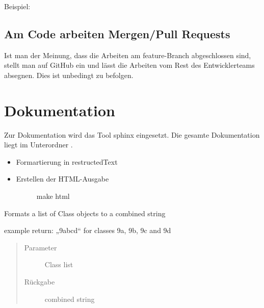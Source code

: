\documentclass[letterpaper,10pt,ngerman]{sphinxmanual}
\begin{document}
Beispiel: 


\section{Am Code arbeiten \textendash{} Mergen/Pull Requests}
\label{\detokenize{dev/git:am-code-arbeiten-mergen-pull-requests}}
Ist man der Meinung, dass die Arbeiten am feature-Branch abgeschlossen sind, stellt man auf GitHub ein  und lässt die Arbeiten vom Rest des Entwicklerteams absegnen.
Dies ist unbedingt zu befolgen.


\chapter{Dokumentation}
\label{\detokenize{dev/doc:dokumentation}}\label{\detokenize{dev/doc::doc}}
Zur Dokumentation wird das Tool sphinx eingesetzt. Die gesamte Dokumentation liegt im Unterordner .
\begin{itemize}
\item {} 
Formartierung in restructedText

\item {} \begin{description}
\item[{Erstellen der HTML-Ausgabe}] \leavevmode
make html

\end{description}

\end{itemize}
\label{\detokenize{index:module-untisconnect.api}}

\begin{fulllineitems}
\label{\detokenize{index:untisconnect.api.format_classes}}
Formats a list of Class objects to a combined string

example return: „9abcd“ for classes 9a, 9b, 9c and 9d
\begin{quote}\begin{description}
\item[{Parameter}] \leavevmode
{} \textendash{} Class list

\item[{Rückgabe}] \leavevmode
combined string

\end{description}\end{quote}

\end{fulllineitems}
\end{document}
